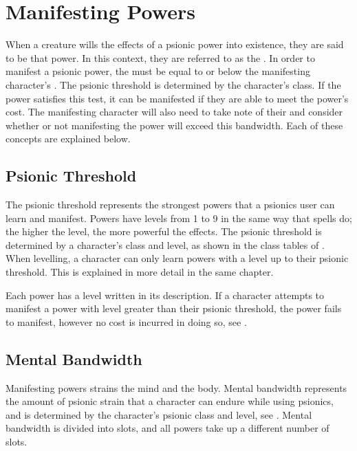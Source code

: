 \section{Manifesting Powers}
\label{sec:manifesting_powers}
When a creature wills the effects of a psionic power
into existence,
they are said to be  that power.
In this context,
they are referred to as the .
In order to manifest a psionic power,
the  must be equal to or below
the manifesting character's .
The psionic threshold is determined by the character's class.
If the power satisfies this test,
it can be manifested if they are able to
meet the power's  cost.
The manifesting character will also need to take note of their
 and consider
whether or not manifesting the power will exceed this bandwidth.
Each of these concepts are explained below.

\subsection{Psionic Threshold}
The psionic threshold represents the strongest powers
that a psionics user can learn and manifest.
Powers have levels from 1 to 9 in the same way that spells do;
the higher the level, the more powerful the effects.
The psionic threshold is determined by a character's class
and level,
as shown in the class tables of .
When levelling,
a character can only learn powers with a level up to
their psionic threshold.
This is explained in more detail in the same chapter.

Each power has a level written in its description.
If a character attempts to manifest a power with level
greater than their psionic threshold,
the power fails to manifest,
however no cost is incurred in doing so,
see .

\subsection{Mental Bandwidth}
Manifesting powers strains the mind and the body.
Mental bandwidth represents the amount of psionic strain that
a character can endure while using psionics,
and is determined by the character's psionic class and level,
see .
Mental bandwidth is divided into slots,
and all powers take up a different number of slots.

